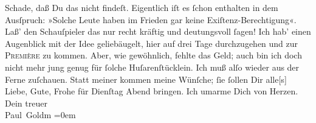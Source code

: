 \begin{ledgroupsized}[t]{13cm}
           \pstart
           {\pb}Schade, daß Du das \label{K_L02789-4v}\label{K_L02789-4h} nicht findeſt.  Eigentlich iſt es  ſchon enthalten in dem Ausſpruch: »Solche Leute haben im Frieden gar
                  keine Exiſtenz-Berechtigung«. Laß’ den Schauſpieler das nur recht kräftig und deutungsvoll
               ſagen!\pend
           \pstart
           Ich hab’ einen Augenblick mit der Idee geliebäugelt, hier auf drei Tage durchzugehen
               und zur \textsc{Première} zu kommen. Aber, wie gewöhnlich, fehlte
               das Geld; auch bin ich doch nicht mehr jung genug für ſolche Huſarenſtücklein. Ich
               muß alſo wieder aus der Ferne zuſchauen. Statt meiner kommen meine Wünſche; ſie
               ſollen Dir alle{[}s{]} Liebe, Gute, Frohe für Dienſtag{ }Abend bringen. Ich umarme Dich von Herzen.\pend
           \pstart
           Dein treuer {\\[\baselineskip]}\spacefill\mbox{Paul Goldm}\pend
           \leftskip=0em{}\pstart
           \noindent{}\label{T_L02789-1v}\label{T_L02789-1h}\pend
           
         
         \endnumbering{}\end{ledgroupsized}  \newcommand{\dateiname}{L02789}\newcommand{\titel}{Paul Goldmann an Arthur Schnitzler, 1. 11. [1896]}\newcommand{\editorInnen}{Martin Anton Müller und Laura Untner}
      